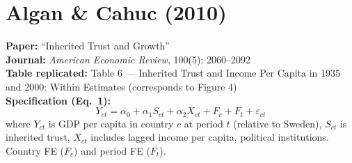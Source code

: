 \documentclass[11pt,a4paper]{article}
\begin{document}
\newpage

\section{Algan \& Cahuc (2010)}

\textbf{Paper:} ``Inherited Trust and Growth''\\
\textbf{Journal:} \textit{American Economic Review}, 100(5): 2060--2092\\
\textbf{Table replicated:} Table 6 --- Inherited Trust and Income Per Capita in 1935 and 2000: Within Estimates (corresponds to Figure 4)\\
\textbf{Specification (Eq.\ 1):}
\[
Y_{ct} = \alpha_0 + \alpha_1 S_{ct} + \alpha_2 X_{ct} + F_c + F_t + \varepsilon_{ct}
\]
where $Y_{ct}$ is GDP per capita in country $c$ at period $t$ (relative to Sweden), $S_{ct}$ is inherited trust, $X_{ct}$ includes lagged income per capita, political institutions. Country FE ($F_c$) and period FE ($F_t$).

\vspace{0.3cm}
\noindent{}
\end{document}
